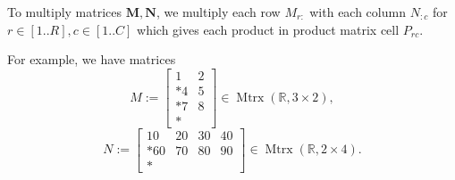 \documentclass{article}
\begin{document}
To multiply matrices $\mathbf{M}, \mathbf{N}$, we multiply each row ${M}_{r:}$ with each column ${N}_{:c}$ for $r \in [1..R], c \in [1..C]$ which gives each product in product matrix cell $P_{rc}$.

For example, we have matrices
\begin{equation}
    M := \left[
        \begin{matrix}
            1 & 2 \\*
            4 & 5 \\*
            7 & 8 \\*
        \end{matrix}
    \right] \in \operatorname{Mtrx}(\mathbb{R}, 3\times2),
\end{equation}
\begin{equation}
    N := \left[
        \begin{matrix}
            10 & 20 & 30 & 40 \\*
            60 & 70 & 80 & 90 \\*
        \end{matrix}
    \right] \in \operatorname{Mtrx}(\mathbb{R}, 2\times4).
\end{equation}
\end{document}
